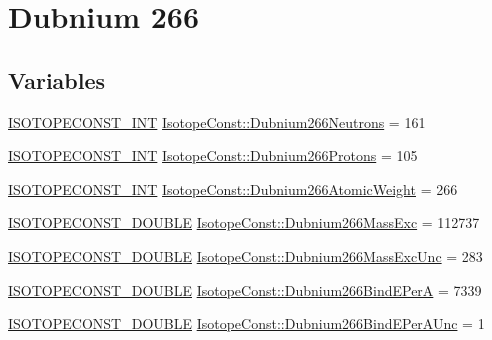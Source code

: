 \hypertarget{group___isotope_const-_dubnium-_db266}{}\section{Dubnium 266}
\label{group___isotope_const-_dubnium-_db266}
\subsection*{Variables}
\begin{DoxyCompactItemize}
\item 
\mbox{\hyperlink{group___isotope_const-_macros_ga5f18360b3e99483a35c32d789e62621c}{I\+S\+O\+T\+O\+P\+E\+C\+O\+N\+S\+T\+\_\+\+I\+NT}} \mbox{\hyperlink{group___isotope_const-_dubnium-_db266_gaebecc84a691e353022edd678c8aba2f1}{Isotope\+Const\+::\+Dubnium266\+Neutrons}} = 161
\item 
\mbox{\hyperlink{group___isotope_const-_macros_ga5f18360b3e99483a35c32d789e62621c}{I\+S\+O\+T\+O\+P\+E\+C\+O\+N\+S\+T\+\_\+\+I\+NT}} \mbox{\hyperlink{group___isotope_const-_dubnium-_db266_gaa2e616be1cd7cd977dc402aa7560d8c6}{Isotope\+Const\+::\+Dubnium266\+Protons}} = 105
\item 
\mbox{\hyperlink{group___isotope_const-_macros_ga5f18360b3e99483a35c32d789e62621c}{I\+S\+O\+T\+O\+P\+E\+C\+O\+N\+S\+T\+\_\+\+I\+NT}} \mbox{\hyperlink{group___isotope_const-_dubnium-_db266_gaa548d923a611f62cffda52a2f9db327b}{Isotope\+Const\+::\+Dubnium266\+Atomic\+Weight}} = 266
\item 
\mbox{\hyperlink{group___isotope_const-_macros_ga8f45a7272ce02c0b4c65c44636ed719a}{I\+S\+O\+T\+O\+P\+E\+C\+O\+N\+S\+T\+\_\+\+D\+O\+U\+B\+LE}} \mbox{\hyperlink{group___isotope_const-_dubnium-_db266_ga5d3f5ec3ffcd15b01961158e7eb5aebb}{Isotope\+Const\+::\+Dubnium266\+Mass\+Exc}} = 112737
\item 
\mbox{\hyperlink{group___isotope_const-_macros_ga8f45a7272ce02c0b4c65c44636ed719a}{I\+S\+O\+T\+O\+P\+E\+C\+O\+N\+S\+T\+\_\+\+D\+O\+U\+B\+LE}} \mbox{\hyperlink{group___isotope_const-_dubnium-_db266_ga396115fa6388d4d60619eea7325cee1a}{Isotope\+Const\+::\+Dubnium266\+Mass\+Exc\+Unc}} = 283
\item 
\mbox{\hyperlink{group___isotope_const-_macros_ga8f45a7272ce02c0b4c65c44636ed719a}{I\+S\+O\+T\+O\+P\+E\+C\+O\+N\+S\+T\+\_\+\+D\+O\+U\+B\+LE}} \mbox{\hyperlink{group___isotope_const-_dubnium-_db266_gacea1f46243e71785720196925f32474d}{Isotope\+Const\+::\+Dubnium266\+Bind\+E\+PerA}} = 7339
\item 
\mbox{\hyperlink{group___isotope_const-_macros_ga8f45a7272ce02c0b4c65c44636ed719a}{I\+S\+O\+T\+O\+P\+E\+C\+O\+N\+S\+T\+\_\+\+D\+O\+U\+B\+LE}} \mbox{\hyperlink{group___isotope_const-_dubnium-_db266_ga608e8cf72af84a72d6ddeef9b065b01a}{Isotope\+Const\+::\+Dubnium266\+Bind\+E\+Per\+A\+Unc}} = 1

\end{DoxyCompactItemize}
